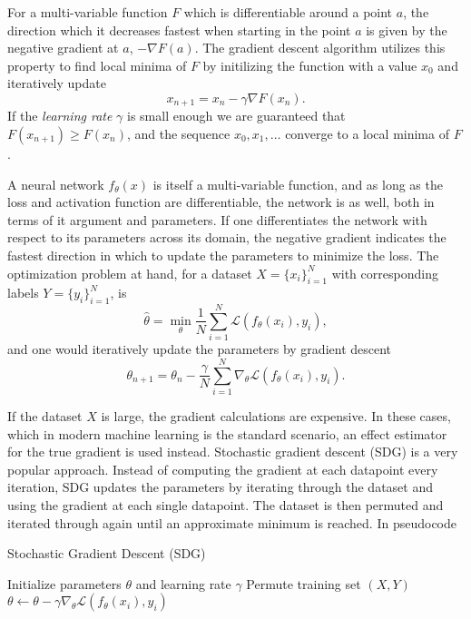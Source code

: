 \documentclass[../../thesis.tex]{subfiles}
\begin{document}
For a multi-variable function $F$ which is differentiable around a point $a$, the direction which it decreases fastest when starting in the point $a$ is given by the negative gradient at $a$, $-\nabla F(a)$. The gradient descent algorithm utilizes this property to find local minima of $F$ by initilizing the function with a value $x_0$ and iteratively update 
\[
    x_{n+1} = x_{n} -\gamma \nabla F(x_{n}).
\] 
If the \textit{learning rate} $\gamma$ is small enough we are guaranteed that $F(x_{n+1})\geq F(x_{n})$, and the sequence $x_0,x_1,\dots$ converge to a local minima of $F$.\newline

A neural network $f_\theta(x)$ is itself a multi-variable function, and as long as the loss and activation function are differentiable, the network is as well, both in terms of it argument and parameters. If one differentiates the network with respect to its parameters across its domain, the negative gradient indicates the fastest direction in which to update the parameters to minimize the loss. The optimization problem at hand, for a dataset $X = \{x_i\}_{i=1}^N$ with corresponding labels $Y = \{y_i\}_{i=1}^N$, is
\[
   \widehat{\theta} = \min_{\theta} \frac{1}{N}\sum_{i=1}^N \mathcal{L}(f_\theta(x_i),y_i),
\]
and one would iteratively update the parameters by gradient descent 
\[
    \theta_{n+1} = \theta_{n} - \frac{\gamma}{N}\sum_{i=1}^N\nabla_\theta \mathcal{L}(f_\theta(x_i),y_i).
\]

If the dataset $X$ is large, the gradient calculations are expensive. In these cases, which in modern machine learning is the standard scenario, an effect estimator for the true gradient is used instead. Stochastic gradient descent (SDG) is a very popular approach. Instead of computing the gradient at each datapoint every iteration, SDG updates the parameters by iterating through the dataset and using the gradient at each single datapoint. The dataset is then permuted and iterated through again until an approximate minimum is reached. In pseudocode 

\begin{algorithm}
\caption{Stochastic Gradient Descent (SDG)}
\begin{algorithmic}
    \State Initialize parameters $\theta$ and learning rate $\gamma$
        \State Permute training set $(X,Y)$
        \State $\theta \gets \theta - \gamma\nabla_\theta \mathcal{L}(f_\theta(x_i),y_i)$
    \EndFor
    \EndWhile
\end{algorithmic}
\end{algorithm}
\end{document}

